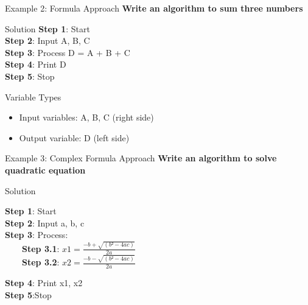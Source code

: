 \documentclass[aspectratio=169]{beamer}
\begin{document}
\begin{frame}{Example 2: Formula Approach}
    \textbf{Write an algorithm to sum three numbers}
    
    \begin{exampleblock}{Solution} 
            \textbf{Step 1}: Start \\
            \textbf{Step 2}: Input A, B, C  \\
            \textbf{Step 3}: Process D = A + B + C  \\
            \textbf{Step 4}: Print D  \\
            \textbf{Step 5}: Stop 
        
    \end{exampleblock}
    
    \vspace{0.3cm}
    \begin{block}{Variable Types}
        \begin{itemize}
            \item Input variables: A, B, C (right side)
            \item Output variable: D (left side)
        \end{itemize}
    \end{block}
\end{frame}

\begin{frame}{Example 3: Complex Formula Approach}
    \textbf{Write an algorithm to solve quadratic equation}
    
    \begin{exampleblock}{Solution} 
   
            \textbf{Step 1}: Start \\
            \textbf{Step 2}: Input a, b, c \\
            \textbf{Step 3}: Process: \\
                
            \     \   \     \ \textbf{Step 3.1}: $x1 = \frac{-b +  \sqrt{(b² - 4ac)}}{2a} $ \\
            \     \   \     \ \textbf{Step 3.2}: $x2 = \frac{-b -  \sqrt{(b² - 4ac)}}{2a} $
               
            \textbf{Step 4}: Print x1, x2  \\
            \textbf{Step 5}:Stop 
            
   
    


            
    \end{exampleblock}
\end{frame}
\end{document}
